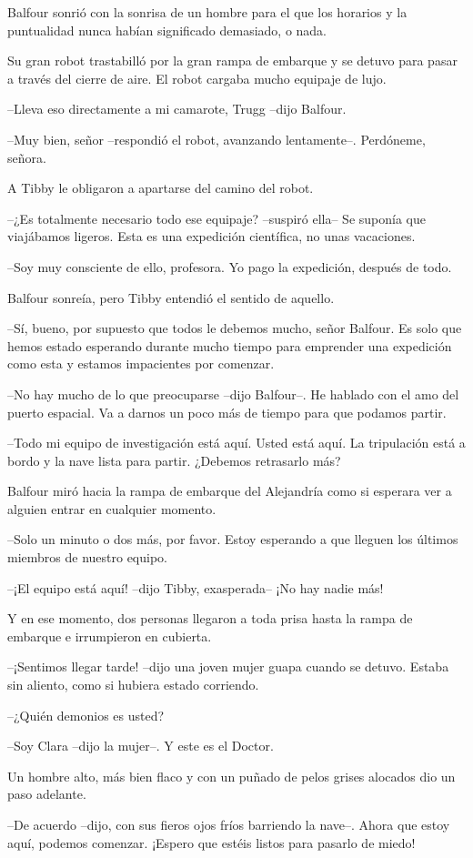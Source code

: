 {Balfour sonrió con la sonrisa de un hombre para el que los horarios y la
puntualidad nunca habían significado demasiado, o nada.}

{Su gran robot trastabilló por la gran rampa de embarque y se detuvo para
 pasar a través del cierre de aire. El robot cargaba mucho equipaje de
lujo.}

{--Lleva eso directamente a mi camarote, Trugg --dijo Balfour.}

{--Muy bien, señor --respondió el robot, avanzando lentamente--.
Perdóneme, señora.}

{A Tibby le obligaron a apartarse del camino del robot.}

{--¿Es totalmente necesario todo ese equipaje? --suspiró ella-- Se
 suponía que viajábamos ligeros. Esta es una expedición científica, no
unas vacaciones.}

{--Soy muy consciente de ello, profesora. Yo pago la expedición, después
de todo.}

{Balfour sonreía, pero Tibby entendió el sentido de aquello.}

{--Sí, bueno, por supuesto que todos le debemos mucho, señor Balfour. Es
 solo que hemos estado esperando durante mucho tiempo para emprender una
expedición como esta y estamos impacientes por comenzar.}

{--No hay mucho de lo que preocuparse --dijo Balfour--. He hablado con el
 amo del puerto espacial. Va a darnos un poco más de tiempo para que
podamos partir.}

{--Todo mi equipo de investigación está aquí. Usted está aquí. La
 tripulación está a bordo y la nave lista para partir. ¿Debemos
retrasarlo más?}

{Balfour miró hacia la rampa de embarque del Alejandría como si esperara
ver a alguien entrar en cualquier momento.}

{--Solo un minuto o dos más, por favor. Estoy esperando a que lleguen los
últimos miembros de nuestro equipo.}

{--¡El equipo está aquí! --dijo Tibby, exasperada-- ¡No hay nadie más!}

{Y en ese momento, dos personas llegaron a toda prisa hasta la rampa de
embarque e irrumpieron en cubierta.}

{--¡Sentimos llegar tarde! --dijo una joven mujer guapa cuando se detuvo.
Estaba sin aliento, como si hubiera estado corriendo.}

{--¿Quién demonios es usted?}

{--Soy Clara --dijo la mujer--. Y este es el Doctor.}

{Un hombre alto, más bien flaco y con un puñado de pelos grises alocados
dio un paso adelante.}

{--De acuerdo --dijo, con sus fieros ojos fríos barriendo la nave--.
 Ahora que estoy aquí, podemos comenzar. ¡Espero que estéis listos para
pasarlo de miedo!}
